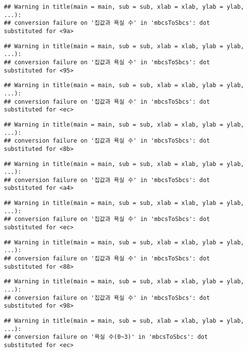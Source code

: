\documentclass[
]{article}
\begin{document}
\begin{verbatim}
## Warning in title(main = main, sub = sub, xlab = xlab, ylab = ylab, ...):
## conversion failure on '집값과 욕실 수' in 'mbcsToSbcs': dot substituted for <9a>
\end{verbatim}

\begin{verbatim}
## Warning in title(main = main, sub = sub, xlab = xlab, ylab = ylab, ...):
## conversion failure on '집값과 욕실 수' in 'mbcsToSbcs': dot substituted for <95>
\end{verbatim}

\begin{verbatim}
## Warning in title(main = main, sub = sub, xlab = xlab, ylab = ylab, ...):
## conversion failure on '집값과 욕실 수' in 'mbcsToSbcs': dot substituted for <ec>
\end{verbatim}

\begin{verbatim}
## Warning in title(main = main, sub = sub, xlab = xlab, ylab = ylab, ...):
## conversion failure on '집값과 욕실 수' in 'mbcsToSbcs': dot substituted for <8b>
\end{verbatim}

\begin{verbatim}
## Warning in title(main = main, sub = sub, xlab = xlab, ylab = ylab, ...):
## conversion failure on '집값과 욕실 수' in 'mbcsToSbcs': dot substituted for <a4>
\end{verbatim}

\begin{verbatim}
## Warning in title(main = main, sub = sub, xlab = xlab, ylab = ylab, ...):
## conversion failure on '집값과 욕실 수' in 'mbcsToSbcs': dot substituted for <ec>
\end{verbatim}

\begin{verbatim}
## Warning in title(main = main, sub = sub, xlab = xlab, ylab = ylab, ...):
## conversion failure on '집값과 욕실 수' in 'mbcsToSbcs': dot substituted for <88>
\end{verbatim}

\begin{verbatim}
## Warning in title(main = main, sub = sub, xlab = xlab, ylab = ylab, ...):
## conversion failure on '집값과 욕실 수' in 'mbcsToSbcs': dot substituted for <98>
\end{verbatim}

\begin{verbatim}
## Warning in title(main = main, sub = sub, xlab = xlab, ylab = ylab, ...):
## conversion failure on '욕실 수(0~3)' in 'mbcsToSbcs': dot substituted for <ec>
\end{verbatim}
\end{document}
